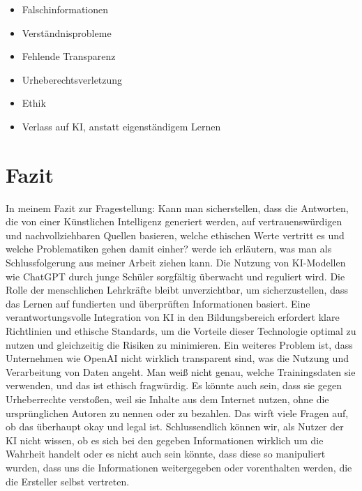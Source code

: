 \documentclass{report}
\begin{document}
\begin{itemize}
 
    \item Falschinformationen
    \item Verständnisprobleme
    \item Fehlende Transparenz
    \item Urheberechtsverletzung
    \item Ethik
    \item  Verlass auf KI, anstatt eigenständigem Lernen
 
\end{itemize}

\section{Fazit}
In meinem Fazit zur Fragestellung: Kann man sicherstellen, dass die Antworten, die von einer Künstlichen Intelligenz generiert werden, auf vertrauenswürdigen und nachvollziehbaren Quellen basieren, welche ethischen Werte vertritt es und welche Problematiken gehen damit einher? werde ich erläutern, was man als Schlussfolgerung aus meiner Arbeit ziehen kann. Die Nutzung von KI-Modellen wie ChatGPT durch junge Schüler sorgfältig überwacht und reguliert wird. Die Rolle der menschlichen Lehrkräfte bleibt unverzichtbar, um sicherzustellen, dass das Lernen auf fundierten und überprüften Informationen basiert. Eine verantwortungsvolle Integration von KI in den Bildungsbereich erfordert klare Richtlinien und ethische Standards, um die Vorteile dieser Technologie optimal zu nutzen und gleichzeitig die Risiken zu minimieren. Ein weiteres Problem ist, dass Unternehmen wie OpenAI nicht wirklich transparent sind, was die Nutzung und Verarbeitung von Daten angeht. Man weiß nicht genau, welche Trainingsdaten sie verwenden, und das ist ethisch fragwürdig. Es könnte auch sein, dass sie gegen Urheberrechte verstoßen, weil sie Inhalte aus dem Internet nutzen, ohne die ursprünglichen Autoren zu nennen oder zu bezahlen. Das wirft viele Fragen auf, ob das überhaupt okay und legal ist.
Schlussendlich können wir, als Nutzer der KI nicht wissen, ob es sich bei den gegeben Informationen wirklich um die Wahrheit handelt oder es nicht auch sein könnte, dass diese so manipuliert wurden, dass uns die Informationen weitergegeben oder vorenthalten werden, die die Ersteller selbst vertreten.


\nocite{*}
\printbibliography
\end{document}
